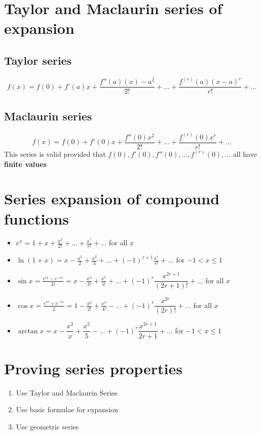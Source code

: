 

\section{Taylor and Maclaurin series of expansion}
\subsection{Taylor series}
$$f(x)=f(0)+f'(a)x+\frac{f''(a)(x)-a^2}{2!}+\dots+\frac{f^{(r)}(a)(x-a)^r}{r!}+\dots$$

\subsection{Maclaurin series}
$$f(x)=f(0)+f'(0)x+\frac{f''(0)x^2}{2!}+\dots+\frac{f^{(r)}(0)x^r}{r!}+\dots$$
This series is valid provided that $f(0), f'(0), f''(0),\dots,f^{(r)}(0),\dots$ all have \textbf{finite values}

\section{Series expansion of compound functions}
\begin{itemize}
	\item $e^{x}=1+x+\frac{x^{2}}{2!}+...+\frac{x^{r}}{r!}+...$ for all $x$
	\item $\ln(1+x) = x - \frac{x^{2}}{2} + \frac{x^{3}}{3} + ... + (-1)^{r+1}\frac{x^{r}}{r!} +...$ for $-1<x\leq1$
	\item $\sin x = \frac{e^{ix}-e^{-ix}}{2i}=x-\frac{x^{3}}{3!}+\frac{x^{5}}{5!}+...+(-1)^r\dfrac{x^{2r+1}}{(2r+1)!}+\dots$ for all $x$
	\item $\cos x = \frac{e^{ix}+e^{-ix}}{2}=1-\frac{x^{2}}{2!}+\frac{x^{4}}{4!}-...+(-1)^r\dfrac{x^{2r}}{(2r)!}+\dots$ for all $x$
	\item $\arctan x = x-\dfrac{x^3}{x}+\dfrac{x^5}{5}-\dots+(-1)^r\dfrac{x^{2r+1}}{2r+1}+\dots$ for $-1<x\leq1$
\end{itemize}

\section{Proving series properties}
\begin{enumerate}
	\item Use Taylor and Maclaurin Series
	\item Use basic formulae for expansion
	\item Use geometric series
\end{enumerate}

